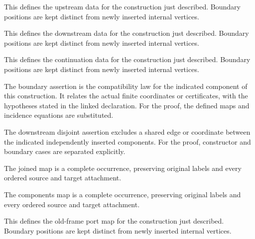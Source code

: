This defines the upstream data for the construction just described. Boundary positions are kept distinct from newly inserted internal vertices.
\par{}

This defines the downstream data for the construction just described. Boundary positions are kept distinct from newly inserted internal vertices.
\par{}

This defines the continuation data for the construction just described. Boundary positions are kept distinct from newly inserted internal vertices.
\par{}

The boundary assertion is the compatibility law for the indicated component of this construction. It relates the actual finite coordinates or certificates, with the hypotheses stated in the linked declaration.
For the proof, the defined maps and incidence equations are substituted.
\par{}

The downstream disjoint assertion excludes a shared edge or coordinate between the indicated independently inserted components.
For the proof, constructor and boundary cases are separated explicitly.
\par{}

The joined map is a complete occurrence, preserving original labels and every ordered source and target attachment.
\par{}

The components map is a complete occurrence, preserving original labels and every ordered source and target attachment.
\par{}

This defines the old-frame port map for the construction just described. Boundary positions are kept distinct from newly inserted internal vertices.
\par{}

